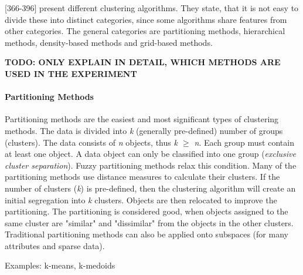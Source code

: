 
\textcite{han2011data}[366-396] present different clustering algorithms. They state, that it is not easy to divide these into distinct categories, since some algorithms share features from other categories. The general categories are partitioning methods, hierarchical methods, density-based methods and grid-based methods.

\textbf{TODO: ONLY EXPLAIN IN DETAIL, WHICH METHODS ARE USED IN THE EXPERIMENT}
  \paragraph{Partitioning Methods}
  Partitioning methods are the easiest and most significant types of clustering methods. The data is divided into \textit{k} (generally pre-defined) number of groups (clusters). The data consists of \textit{n} objects, thus \textit{k $\geq$ n}. Each group must contain at least one object. A data object can only be classified into one group (\textit{exclusive cluster separation}). Fuzzy partitioning methods relax this condition.
  Many of the partitioning methods use distance measures to calculate their clusters. If the number of clusters (\textit{k}) is pre-defined, then the clustering algorithm will create an initial segregation into \textit{k} clusters. Objects are then relocated to improve the partitioning. The partitioning is considered good, when objects assigned to the same cluster are "similar" and "dissimilar" from the objects in the other clusters. Traditional partitioning methods can also be applied onto subspaces (for many attributes and sparse data). 
  
  Examples: k-means, k-medoids




